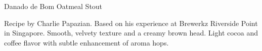 \begin{recipe}{Danado de Bom Oatmeal Stout} %

\begin{aboutblock}
Recipe by Charlie Papazian. Based on his experience at Brewerkz Riverside
Point in Singapore. Smooth, velvety texture and a creamy brown head. Light cocoa
and coffee flavor with subtle enhancement of aroma hops.
\end{aboutblock}


\begin{methodandtiming}

\begin{mashsteps}
\end{mashsteps}

\begin{fermentationsteps}
\end{fermentationsteps}

\end{methodandtiming}

\recipebreak

\begin{ingredientsblock}

\begin{malts}
\end{malts}

\begin{hops}
\end{hops}


\end{ingredientsblock}

\end{recipe}


